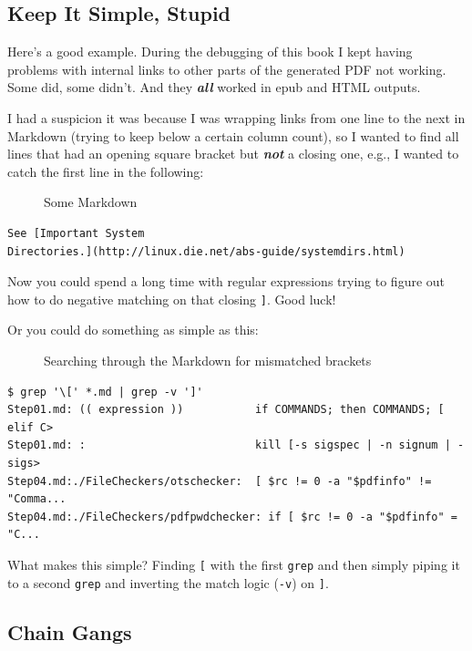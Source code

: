 \documentclass[10pt,]{book}
\numberwithin{figure}{chapter}
\DeclareRobustCommand{\drcap}[1]{\begin{figure}[H]\caption{#1}\end{figure}}
\begin{document}
\subsection*{Keep It Simple, Stupid}\label{keep-it-simple-stupid}

Here's a good example. During the debugging of this book I kept having
problems with internal links to other parts of the generated PDF not
working. Some did, some didn't. And they \textbf{\emph{all}} worked in
epub and HTML outputs.

I had a suspicion it was because I was wrapping links from one line to
the next in Markdown (trying to keep below a certain column count), so I
wanted to find all lines that had an opening square bracket but
\textbf{\emph{not}} a closing one, e.g., I wanted to catch the first
line in the following:

\drcap{Some Markdown}

\begin{verbatim}
See [Important System
Directories.](http://linux.die.net/abs-guide/systemdirs.html)
\end{verbatim}

Now you could spend a long time with regular expressions trying to
figure out how to do negative matching on that closing \texttt{{]}}.
Good luck!

Or you could do something as simple as this:

\drcap{Searching through the Markdown for mismatched brackets}

\begin{verbatim}
$ grep '\[' *.md | grep -v ']'
Step01.md: (( expression ))           if COMMANDS; then COMMANDS; [ elif C>
Step01.md: :                          kill [-s sigspec | -n signum | -sigs>
Step04.md:./FileCheckers/otschecker:  [ $rc != 0 -a "$pdfinfo" != "Comma...
Step04.md:./FileCheckers/pdfpwdchecker: if [ $rc != 0 -a "$pdfinfo" = "C...
\end{verbatim}

What makes this simple? Finding \texttt{{[}} with the first
\texttt{grep} and then simply piping it to a second \texttt{grep} and
inverting the match logic (\texttt{-v}) on \texttt{{]}}.

\subsection*{Chain Gangs}\label{chain-gangs}
\end{document}
